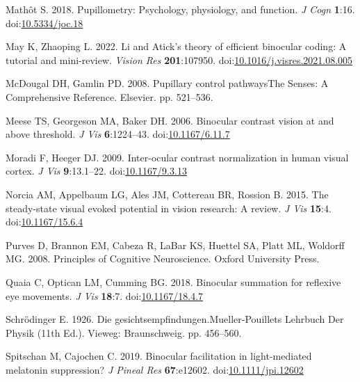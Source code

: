 \documentclass[
]{article}
\newlength{\cslhangindent}
\newlength{\cslentryspacingunit} %
\newenvironment{CSLReferences}[2] %
 {%
  \setlength{\parindent}{0pt}
  \ifodd #1
  \let\oldpar\par
  \def\par{\hangindent=\cslhangindent\oldpar}
  \fi
  \setlength{\parskip}{#2\cslentryspacingunit}
 }%
 {}
\begin{document}
\begin{CSLReferences}{1}{0}
\leavevmode{}%
Mathôt S. 2018. Pupillometry: Psychology, physiology, and function. \emph{J Cogn} \textbf{1}:16. doi:\href{https://doi.org/10.5334/joc.18}{10.5334/joc.18}

\leavevmode{}%
May K, Zhaoping L. 2022. Li and {Atick's} theory of efficient binocular coding: A tutorial and mini-review. \emph{Vision Res} \textbf{201}:107950. doi:\href{https://doi.org/10.1016/j.visres.2021.08.005}{10.1016/j.visres.2021.08.005}

\leavevmode{}%
McDougal DH, Gamlin PD. 2008. Pupillary control pathwaysThe Senses: A Comprehensive Reference. Elsevier. pp. 521--536.

\leavevmode{}%
Meese TS, Georgeson MA, Baker DH. 2006. Binocular contrast vision at and above threshold. \emph{J Vis} \textbf{6}:1224--43. doi:\href{https://doi.org/10.1167/6.11.7}{10.1167/6.11.7}

\leavevmode{}%
Moradi F, Heeger DJ. 2009. Inter-ocular contrast normalization in human visual cortex. \emph{J Vis} \textbf{9}:13.1--22. doi:\href{https://doi.org/10.1167/9.3.13}{10.1167/9.3.13}

\leavevmode{}%
Norcia AM, Appelbaum LG, Ales JM, Cottereau BR, Rossion B. 2015. The steady-state visual evoked potential in vision research: A review. \emph{J Vis} \textbf{15}:4. doi:\href{https://doi.org/10.1167/15.6.4}{10.1167/15.6.4}

\leavevmode{}%
Purves D, Brannon EM, Cabeza R, LaBar KS, Huettel SA, Platt ML, Woldorff MG. 2008. Principles of {Cognitive} {Neuroscience}. Oxford University Press.

\leavevmode{}%
Quaia C, Optican LM, Cumming BG. 2018. Binocular summation for reflexive eye movements. \emph{J Vis} \textbf{18}:7. doi:\href{https://doi.org/10.1167/18.4.7}{10.1167/18.4.7}

\leavevmode{}%
Schrödinger E. 1926. Die gesichtsempfindungen.Mueller-Pouillets Lehrbuch Der Physik (11th Ed.). Vieweg: Braunschweig. pp. 456--560.

\leavevmode{}%
Spitschan M, Cajochen C. 2019. Binocular facilitation in light-mediated melatonin suppression? \emph{J Pineal Res} \textbf{67}:e12602. doi:\href{https://doi.org/10.1111/jpi.12602}{10.1111/jpi.12602}


\end{CSLReferences}
\end{document}

